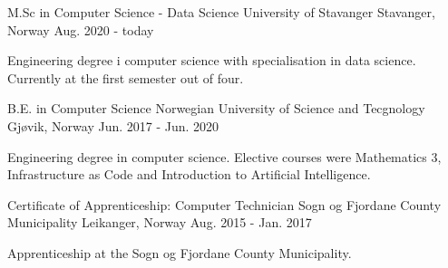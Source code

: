 

\begin{cventries}

  \cventry
    {M.Sc in Computer Science - Data Science} %
    {University of Stavanger} %
    {Stavanger, Norway} %
    {Aug. 2020 - today} %
    {
      \begin{cvitems} %
        \item {Engineering degree i computer science with specialisation in data science. Currently at the first semester out of four.}
      \end{cvitems}
    }

  \cventry
    {B.E. in Computer Science} %
    {Norwegian University of Science and Tecgnology} %
    {Gjøvik, Norway} %
    {Jun. 2017 - Jun. 2020} %
    {
      \begin{cvitems} %
        \item {Engineering degree in computer science. Elective courses were Mathematics 3, Infrastructure as Code and Introduction to Artificial Intelligence.}
      \end{cvitems}
    }

  \cventry
    {Certificate of Apprenticeship: Computer Technician} %
    {Sogn og Fjordane County Municipality} %
    {Leikanger, Norway} %
    {Aug. 2015 - Jan. 2017} %
    {
      \begin{cvitems} %
        \item {Apprenticeship at the Sogn og Fjordane County Municipality.}
      \end{cvitems}
    }

\end{cventries}
